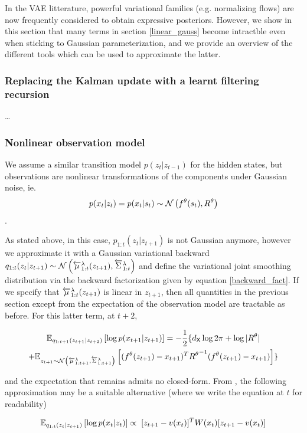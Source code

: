 \documentclass{article}
\begin{document}
In the VAE litterature, powerful variational families (e.g. normalizing flows) are now frequently considered to obtain expressive posteriors. However, we show in this section that many terms in section \ref{linear_gauss} become intractble even when sticking to Gaussian parameterization, and we provide an overview of the different tools which can be used to approximate the latter. 

\subsubsection*{Replacing the Kalman update with a learnt filtering recursion}
\dots

\subsubsection*{Nonlinear observation model}

We assume a similar transition model $p(z_t|z_{t-1})$ for the hidden states, but observations are nonlinear transformations of the components under Gaussian noise, ie. $$p(x_t|z_t) = p(x_t|s_t) \sim \mathcal{N}\left( f^\theta(s_t), R^\theta \right)$$. 

As stated above, in this case, $p_{1:t}(z_t|z_{t+1})$ is not Gaussian anymore, however we approximate it with a Gaussian variational backward $q_{1:t}(z_{t}|z_{t + 1}) \sim \mathcal{N}\left( \overleftarrow{\mu}_{1:t}^\lambda(z_{t+1}), \overleftarrow{\Sigma}_{1:t}^\lambda \right)$ and define the variational joint smoothing distribution via the backward factorization given by equation \ref{backward_fact}. If we specify that $\overleftarrow{\mu}_{1:t}^\lambda(z_{t+1})$ is linear in $z_{t+1}$, then all quantities in the previous section except from the expectation of the observation model are tractable as before. For this latter term, at $t+2$, 

\begin{multline*}
\mathbb{E}_{q_{1:t+1}(z_{t+1}|z_{t+2})}\left[\log p(x_{t+1}|z_{t+1})\right] = -\frac{1}{2}\{d_{\mathsf{X}}\log 2\pi + \log |R^\theta| \\
    + \mathbb{E}_{z_{t+1} \sim \mathcal{N}\left( \overleftarrow{\mu}_{1:t+1}^\lambda, \overleftarrow{\Sigma}_{1:t+1}^\lambda \right)}\left[(f^\theta(z_{t+1}) - x_{t+1})^T {R^\theta}^{-1} (f^\theta(z_{t+1}) - x_{t+1})\right]\} \\
\end{multline*}

and the expectation that remains admits no closed-form. From \cite{johnson}, the following approximation may be a suitable alternative (where we write the equation at $t$ for readability)

\begin{equation}
    \mathbb{E}_{q_{1:t}(z_{t}|z_{t + 1})}\left[\log p(x_t|z_t)\right] \propto \; [z_{t+1} - v(x_t)]^T W(x_t) [z_{t+1} - v(x_t)]
\end{equation}
\end{document}
